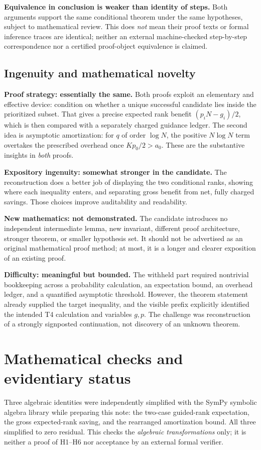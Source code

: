 \documentclass[11pt,letterpaper]{article}
\begin{document}
\noindent\textbf{Equivalence in conclusion is weaker than identity of steps.}
Both arguments support the same conditional theorem under the same hypotheses,
subject to mathematical review. This does \emph{not} mean their proof texts or
formal inference traces are identical; neither an external machine-checked
step-by-step correspondence nor a certified proof-object equivalence is claimed.

\subsection{Ingenuity and mathematical novelty}
\textbf{Proof strategy: essentially the same.}
Both proofs exploit an elementary and effective device: condition on whether a unique
successful candidate lies inside the prioritized subset. That gives a precise expected
rank benefit $(p_iN-g_i)/2$, which is then compared with a separately charged guidance
ledger. The second idea is asymptotic amortization: for $q$ of order $\log N$, the
positive $N\log N$ term overtakes the prescribed overhead once
$Kp_0/2>a_0$. These are the substantive insights in \emph{both} proofs.

\textbf{Expository ingenuity: somewhat stronger in the candidate.}
The reconstruction does a better job of displaying the two conditional ranks,
showing where each inequality enters, and separating gross benefit from net,
fully charged savings. Those choices improve auditability and readability.

\textbf{New mathematics: not demonstrated.}
The candidate introduces no independent intermediate lemma, new invariant, different
proof architecture, stronger theorem, or smaller hypothesis set. It should not be
advertised as an original mathematical proof method; at most, it is a longer and
clearer exposition of an existing proof.

\textbf{Difficulty: meaningful but bounded.}
The withheld part required nontrivial bookkeeping across a probability calculation,
an expectation bound, an overhead ledger, and a quantified asymptotic threshold.
However, the theorem statement already supplied the target inequality, and the
visible prefix explicitly identified the intended T4 calculation and variables
$g,p$. The challenge was reconstruction of a strongly signposted continuation,
not discovery of an unknown theorem.

\section{Mathematical checks and evidentiary status}
Three algebraic identities were independently simplified with the SymPy symbolic
algebra library while preparing this note: the two-case guided-rank expectation,
the gross expected-rank saving, and the rearranged amortization bound. All three
simplified to zero residual. This checks the \emph{algebraic transformations} only;
it is neither a proof of H1--H6 nor acceptance by an external formal verifier.
\end{document}
